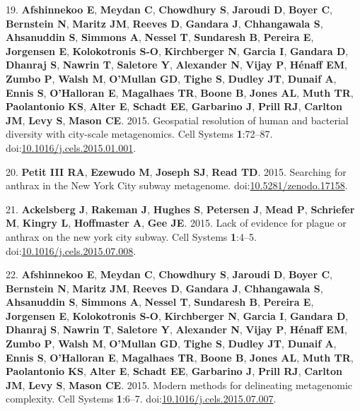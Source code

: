 \documentclass[11pt,]{article}
\begin{document}
\hypertarget{ref-Afshinnekoo2015a}{}
19. \textbf{Afshinnekoo E}, \textbf{Meydan C}, \textbf{Chowdhury S},
\textbf{Jaroudi D}, \textbf{Boyer C}, \textbf{Bernstein N},
\textbf{Maritz JM}, \textbf{Reeves D}, \textbf{Gandara J},
\textbf{Chhangawala S}, \textbf{Ahsanuddin S}, \textbf{Simmons A},
\textbf{Nessel T}, \textbf{Sundaresh B}, \textbf{Pereira E},
\textbf{Jorgensen E}, \textbf{Kolokotronis S-O}, \textbf{Kirchberger N},
\textbf{Garcia I}, \textbf{Gandara D}, \textbf{Dhanraj S},
\textbf{Nawrin T}, \textbf{Saletore Y}, \textbf{Alexander N},
\textbf{Vijay P}, \textbf{Hénaff EM}, \textbf{Zumbo P}, \textbf{Walsh
M}, \textbf{O'Mullan GD}, \textbf{Tighe S}, \textbf{Dudley JT},
\textbf{Dunaif A}, \textbf{Ennis S}, \textbf{O'Halloran E},
\textbf{Magalhaes TR}, \textbf{Boone B}, \textbf{Jones AL}, \textbf{Muth
TR}, \textbf{Paolantonio KS}, \textbf{Alter E}, \textbf{Schadt EE},
\textbf{Garbarino J}, \textbf{Prill RJ}, \textbf{Carlton JM},
\textbf{Levy S}, \textbf{Mason CE}. 2015. Geospatial resolution of human
and bacterial diversity with city-scale metagenomics. Cell Systems
\textbf{1}:72--87.
doi:\href{https://doi.org/10.1016/j.cels.2015.01.001}{10.1016/j.cels.2015.01.001}.

\hypertarget{ref-Petit2015}{}
20. \textbf{Petit III RA}, \textbf{Ezewudo M}, \textbf{Joseph SJ},
\textbf{Read TD}. 2015. Searching for anthrax in the New York City
subway metagenome.
doi:\href{https://doi.org/10.5281/zenodo.17158}{10.5281/zenodo.17158}.

\hypertarget{ref-Ackelsberg2015}{}
21. \textbf{Ackelsberg J}, \textbf{Rakeman J}, \textbf{Hughes S},
\textbf{Petersen J}, \textbf{Mead P}, \textbf{Schriefer M},
\textbf{Kingry L}, \textbf{Hoffmaster A}, \textbf{Gee JE}. 2015. Lack of
evidence for plague or anthrax on the new york city subway. Cell Systems
\textbf{1}:4--5.
doi:\href{https://doi.org/10.1016/j.cels.2015.07.008}{10.1016/j.cels.2015.07.008}.

\hypertarget{ref-Afshinnekoo2015b}{}
22. \textbf{Afshinnekoo E}, \textbf{Meydan C}, \textbf{Chowdhury S},
\textbf{Jaroudi D}, \textbf{Boyer C}, \textbf{Bernstein N},
\textbf{Maritz JM}, \textbf{Reeves D}, \textbf{Gandara J},
\textbf{Chhangawala S}, \textbf{Ahsanuddin S}, \textbf{Simmons A},
\textbf{Nessel T}, \textbf{Sundaresh B}, \textbf{Pereira E},
\textbf{Jorgensen E}, \textbf{Kolokotronis S-O}, \textbf{Kirchberger N},
\textbf{Garcia I}, \textbf{Gandara D}, \textbf{Dhanraj S},
\textbf{Nawrin T}, \textbf{Saletore Y}, \textbf{Alexander N},
\textbf{Vijay P}, \textbf{Hénaff EM}, \textbf{Zumbo P}, \textbf{Walsh
M}, \textbf{O'Mullan GD}, \textbf{Tighe S}, \textbf{Dudley JT},
\textbf{Dunaif A}, \textbf{Ennis S}, \textbf{O'Halloran E},
\textbf{Magalhaes TR}, \textbf{Boone B}, \textbf{Jones AL}, \textbf{Muth
TR}, \textbf{Paolantonio KS}, \textbf{Alter E}, \textbf{Schadt EE},
\textbf{Garbarino J}, \textbf{Prill RJ}, \textbf{Carlton JM},
\textbf{Levy S}, \textbf{Mason CE}. 2015. Modern methods for delineating
metagenomic complexity. Cell Systems \textbf{1}:6--7.
doi:\href{https://doi.org/10.1016/j.cels.2015.07.007}{10.1016/j.cels.2015.07.007}.
\end{document}
